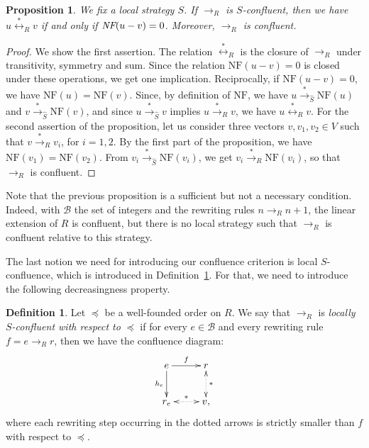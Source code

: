 \documentclass[10pt]{easychair}
\newtheorem{proposition}[theorem]{Proposition}
\theoremstyle{definition}
\newtheorem{definition}[theorem]{Definition}
\newcommand\basis{\mathscr{B}}
\newcommand\rewR{\to_R}
\newcommand\transR{\overset{*}{\to}_R}
\newcommand\transS{\overset{*}{\to}_{\hat{S}}}
\newcommand\equivR{\overset{*}{\leftrightarrow}_R}
\newcommand\NF{\text{NF}}
\newcommand\NFF{\emph{NF}}
\begin{document}
\begin{proposition}\label{prop:h_and_R_confluence}
  We fix a  local strategy $S$. If $\rewR$ is $S$-confluent, then we have
  $u\equivR v$ if and only if $\NFF(u-v)=0$. Moreover, $\rewR$ is
  confluent.
\end{proposition}

\begin{proof}
  We show the first assertion. The relation $\equivR$ is the closure of
  $\rewR$ under transitivity, symmetry and sum. Since the relation
  $\NF(u-v)=0$ is closed under these operations, we get one implication.
  Reciprocally, if $\NF(u-v)=0$, we have $\NF(u)=\NF(v)$. Since, by
  definition of $\NF$, we have $u\transS\NF(u)$ and $v\transS\NF(v)$, and
  since $u\transS v$ implies $u\transR v$, we have $u\equivR v$. For the
  second assertion of the proposition, let us consider three vectors
  $v,v_1,v_2\in V$ such that $v\transR v_i$, for $i=1,2$. By the first
  part of the proposition, we have $\NF(v_1)=\NF(v_2)$. From
  $v_i\transS\NF(v_i)$, we get $v_i\transR\NF(v_i)$, so that $\rewR$ is
  confluent.
\end{proof}
\medskip

Note that the previous proposition is a sufficient but not a necessary
condition. Indeed, with $\basis$ the set of integers and the rewriting
rules $n\rewR n+1$, the linear extension of $R$ is confluent, but there
is no local strategy such that $\rewR$ is confluent relative to this
strategy.
\medskip

The last notion we need for introducing our confluence criterion is local
$S$-confluence, which is introduced in
Definition~\ref{proper:decreasingness_property}. For that, we need to
introduce the following decreasingness property.

\begin{definition}\label{proper:decreasingness_property}
  Let $\preceq$ be a well-founded order on $R$. We say that $\rewR$ is
  \emph{locally $S$-confluent with respect to} $\preceq$ if for every
  $e\in\basis$ and every rewriting rule $f=e\rewR r$, then we have the
  confluence diagram:
  \[
  \xymatrix @C = 2.5em @R = 2.5em{
    e 
    \ar [r] ^{f}
    \ar[d] _{h_e}
    &
    r
    \ar@{<.>} [d] ^{*}
    \\
    r_e
    \ar@{<.>} [r] ^{*}
    & 
    v,
  }
  \]
  where each rewriting step occurring in the dotted arrows is strictly
  smaller than $f$ with respect to  $\preceq$.
\end{definition}
\smallskip
\end{document}
